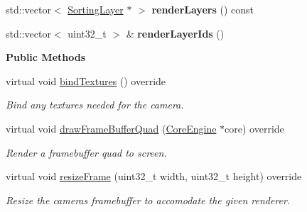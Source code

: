 \begin{Indent}
\begin{DoxyCompactItemize}
\mbox{\label{classrev_1_1_scene_camera_ab3d4030159cbb10e38c82ba821a3860e}} 
std\+::vector$<$ \mbox{\hyperlink{structrev_1_1_sorting_layer}{Sorting\+Layer}} $\ast$ $>$ {\bfseries render\+Layers} () const
\item 
\mbox{\label{classrev_1_1_scene_camera_a7c8f4d5a736d8526ce0d2622c5516e88}} 
std\+::vector$<$ uint32\+\_\+t $>$ \& {\bfseries render\+Layer\+Ids} ()
\end{DoxyCompactItemize}
\end{Indent}
\begin{Indent}\textbf{ Public Methods}\par
\begin{DoxyCompactItemize}
\item 
\mbox{\label{classrev_1_1_scene_camera_ac9a9542fa339f851f58e3a602b46dee4}} 
virtual void \mbox{\hyperlink{classrev_1_1_scene_camera_ac9a9542fa339f851f58e3a602b46dee4}{bind\+Textures}} () override
\begin{DoxyCompactList}\small\item\em Bind any textures needed for the camera. \end{DoxyCompactList}\item 
\mbox{\label{classrev_1_1_scene_camera_ad5be7476a8ef153776ed680d6ab048b9}} 
virtual void \mbox{\hyperlink{classrev_1_1_scene_camera_ad5be7476a8ef153776ed680d6ab048b9}{draw\+Frame\+Buffer\+Quad}} (\mbox{\hyperlink{classrev_1_1_core_engine}{Core\+Engine}} $\ast$core) override
\begin{DoxyCompactList}\small\item\em Render a framebuffer quad to screen. \end{DoxyCompactList}\item 
\mbox{\label{classrev_1_1_scene_camera_a2cc00ef51c784af2cdf9fe9308177c1a}} 
virtual void \mbox{\hyperlink{classrev_1_1_scene_camera_a2cc00ef51c784af2cdf9fe9308177c1a}{resize\+Frame}} (uint32\+\_\+t width, uint32\+\_\+t height) override
\begin{DoxyCompactList}\small\item\em Resize the camera\textquotesingle{}s framebuffer to accomodate the given renderer. \end{DoxyCompactList}\item 

\end{DoxyCompactItemize}
\end{Indent}
